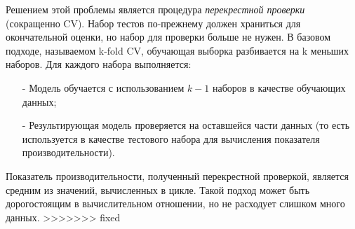Решением этой проблемы является процедура \emph{перекрестной проверки} (сокращенно CV).
Набор тестов по-прежнему должен храниться для окончательной оценки, но набор для
проверки больше не нужен. В базовом подходе, называемом k-fold CV,
обучающая выборка разбивается на k меньших наборов. Для каждого набора
выполняется:

\begin{itemize}
    \item[-] Модель обучается с использованием $k - 1$ наборов в качестве обучающих данных;
    \item[-] Результирующая модель проверяется на оставшейся части данных (то есть
        используется в качестве тестового набора для вычисления показателя
        производительности).
\end{itemize}

Показатель производительности, полученный перекрестной проверкой, является
средним из значений, вычисленных в цикле. Такой подход может быть дорогостоящим
в вычислительном отношении, но не расходует слишком много данных.
>>>>>>> fixed
